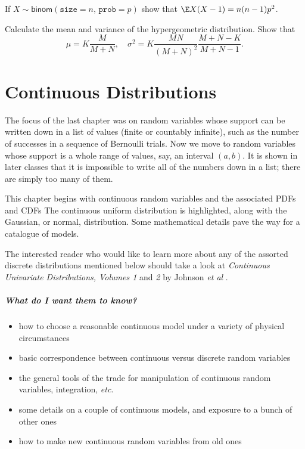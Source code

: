 \documentclass[captions=tableheading]{scrbook}
\begin{document}
\begin{xca}
\label{xca:binom-factorial-expectation}
If \(X\sim\mathsf{binom}(\mathtt{size}=n,\,\mathtt{prob}=p)\) show that \(\E X(X-1)=n(n-1)p^{2}\).
\end{xca}

\begin{xca}
\label{xca:hyper-mean-variance}
Calculate the mean and variance of the hypergeometric distribution. Show that 
\begin{equation}
\mu=K\frac{M}{M+N},\quad\sigma^{2}=K\frac{MN}{(M+N)^{2}}\frac{M+N-K}{M+N-1}.
\end{equation}
\end{xca}
\chapter{Continuous Distributions}
\label{sec-6}

\label{cha:Continuous-Distributions}


\noindent The focus of the last chapter was on random variables whose support can be written down in a list of values (finite or countably infinite), such as the number of successes in a sequence of Bernoulli trials. Now we move to random variables whose support is a whole range of values, say, an interval \((a,b)\). It is shown in later classes that it is impossible to write all of the numbers down in a list; there are simply too many of them.

This chapter begins with continuous random variables and the associated PDFs and CDFs The continuous uniform distribution is highlighted, along with the Gaussian, or normal, distribution. Some mathematical details pave the way for a catalogue of models.

The interested reader who would like to learn more about any of the assorted discrete distributions mentioned below should take a look at \emph{Continuous Univariate Distributions, Volumes 1} and \emph{2} by Johnson \emph{et al} \cite{Johnson1994,Johnson1995}.


\paragraph*{What do I want them to know?}

\begin{itemize}
\item how to choose a reasonable continuous model under a variety of physical circumstances
\item basic correspondence between continuous versus discrete random variables
\item the general tools of the trade for manipulation of continuous random variables, integration, \emph{etc}.
\item some details on a couple of continuous models, and exposure to a bunch of other ones
\item how to make new continuous random variables from old ones
\end{itemize}
\end{document}
